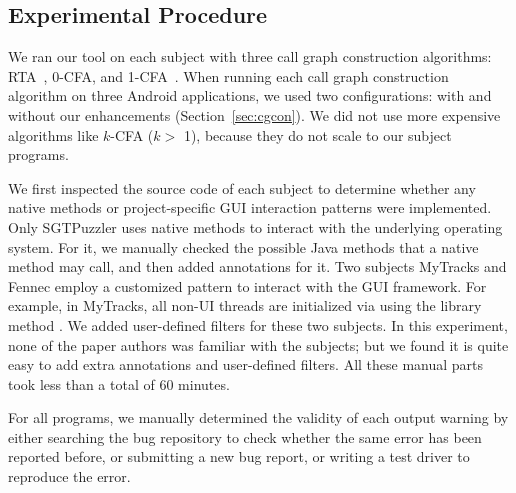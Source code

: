 \smallstep
\tinystep

\subsection{Experimental Procedure}
\label{sec:procedural}

We ran our tool on each subject with three call graph construction
algorithms: RTA~\cite{rta}, 0-CFA, and 1-CFA~\cite{kcfa}.  When running
each call graph construction algorithm on three Android applications, we
used two configurations: with and without our enhancements
(Section~\ref{sec:cgcon}).  We did not use more expensive algorithms like $k$-CFA ($k >$ 1),
because they do not scale to our subject programs.

We first inspected the source code of each subject to determine whether any
native methods or project-specific GUI interaction patterns were implemented.
Only SGTPuzzler uses native methods to interact with
the underlying operating system. For it, we manually checked the possible
Java methods that a native method may call, and then added \annotationnum {}
annotations for it. Two subjects MyTracks and Fennec employ a customized pattern
to interact with the GUI framework. For example, in MyTracks, all non-UI
threads are initialized via using the library method  .
We added \filternum user-defined filters for these two subjects.
In this experiment, none of the paper
authors was familiar with the subjects; but we found it is quite easy
to add extra annotations and user-defined filters. All these
manual parts took less than a total of 60 minutes.

For all \subnum programs, we manually determined the validity of each output warning
by either searching the
bug repository to check whether the same error has been reported before,
or submitting a new bug report, or writing a test driver to reproduce
the error.



